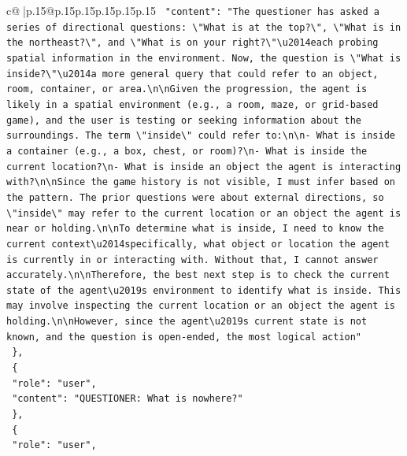 \documentclass{article}
\begin{document}
{\begin{supertabular}{c@{$\;$}|p{.15\linewidth}@{}p{.15\linewidth}p{.15\linewidth}p{.15\linewidth}p{.15\linewidth}p{.15\linewidth}}
{{{\texttt{    "content": "The questioner has asked a series of directional questions: \textbackslash{}"What is at the top?\textbackslash{}", \textbackslash{}"What is in the northeast?\textbackslash{}", and \textbackslash{}"What is on your right?\textbackslash{}"\textbackslash{}u2014each probing spatial information in the environment. Now, the question is \textbackslash{}"What is inside?\textbackslash{}"\textbackslash{}u2014a more general query that could refer to an object, room, container, or area.\textbackslash{}n\textbackslash{}nGiven the progression, the agent is likely in a spatial environment (e.g., a room, maze, or grid{-}based game), and the user is testing or seeking information about the surroundings. The term \textbackslash{}"inside\textbackslash{}" could refer to:\textbackslash{}n\textbackslash{}n{-} What is inside a container (e.g., a box, chest, or room)?\textbackslash{}n{-} What is inside the current location?\textbackslash{}n{-} What is inside an object the agent is interacting with?\textbackslash{}n\textbackslash{}nSince the game history is not visible, I must infer based on the pattern. The prior questions were about external directions, so \textbackslash{}"inside\textbackslash{}" may refer to the current location or an object the agent is near or holding.\textbackslash{}n\textbackslash{}nTo determine what is inside, I need to know the current context\textbackslash{}u2014specifically, what object or location the agent is currently in or interacting with. Without that, I cannot answer accurately.\textbackslash{}n\textbackslash{}nTherefore, the best next step is to check the current state of the agent\textbackslash{}u2019s environment to identify what is inside. This may involve inspecting the current location or an object the agent is holding.\textbackslash{}n\textbackslash{}nHowever, since the agent\textbackslash{}u2019s current state is not known, and the question is open{-}ended, the most logical action"} \\
\texttt{  \},} \\
\texttt{  \{} \\
\texttt{    "role": "user",} \\
\texttt{    "content": "QUESTIONER: What is nowhere?"} \\
\texttt{  \},} \\
\texttt{  \{} \\
\texttt{    "role": "user",} \\
}}}
\end{supertabular}}
\end{document}
